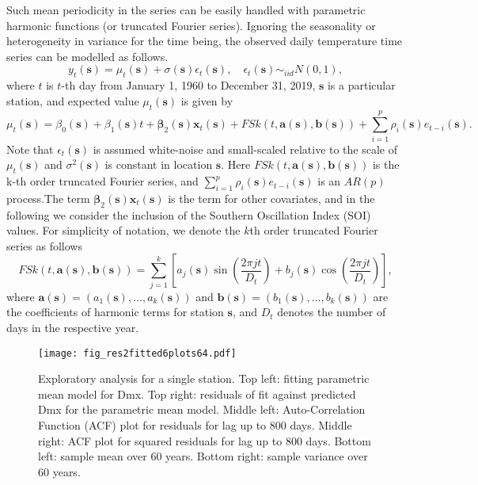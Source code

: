 \documentclass[fleqn,10pt]{wlscirep}
\newcommand{\bx}{\mathbf{x}}
\newcommand{\bs}{\mathbf{s}}
\begin{document}
Such mean periodicity in the series can be easily handled with parametric harmonic functions (or truncated Fourier series). Ignoring the seasonality or heterogeneity in variance for the time being, the observed daily temperature time series can be modelled as follows.
\begin{equation} \label{eq.meanmdl}
	y_{t}(\bs) = \mu_{t}(\bs) + \sigma(\bs)\epsilon_t(\bs), \quad \epsilon_t(\bs) \sim_{iid} N(0,1),
\end{equation}
where $t$ is $t$-th day from January 1, 1960 to December 31, 2019, $\bs$ is a particular station, and expected value $\mu_{t}(\bs)$ is given by
\begin{equation}\mu_{t}(\bs)= \beta_{0}(\bs) + \beta_{1}(\bs) t + \mathbf{\beta}_2(\bs) \bx_t(\bs) + FSk(t,\boldsymbol{a}(\bs),\boldsymbol{b}(\bs)) + \sum_{i=1}^p \rho_i(\bs) e_{t-i}(\bs).
\end{equation}
{Note that $\epsilon_t(\bs)$ is assumed white-noise and small-scaled relative to the scale of $\mu_{t}(\bs)$ and $\sigma^2(\bs)$ is constant in location $\bs$.}
Here $FSk(t,\boldsymbol{a}(\bs),\boldsymbol{b}(\bs))$ is the k-th order truncated Fourier series, and $\sum_{i=1}^p \rho_i(\bs) e_{t-i}(\bs)$ is an $AR(p)$ process.The term $\mathbf{\beta}_2(\bs) \bx_t(\bs)$ is the term for other covariates, and in the following we consider the inclusion of the Southern Oscillation Index (SOI) values. For simplicity of notation, we denote the $k$th order truncated Fourier series as follows
\[ FSk(t,\boldsymbol{a}(\bs),\boldsymbol{b}(\bs)) = \sum_{j=1}^{k}\left[ a_{j}(\bs) \sin\left(\frac{2\pi j t}{D_t}\right) +b_{j}(\bs) \cos\left(\frac{2\pi j t}{D_t}\right) \right],\]
where $\boldsymbol{a}(\bs) = (a_1(\bs),\ldots,a_k(\bs))$ and $\boldsymbol{b}(\bs) = (b_1(\bs),\ldots,b_k(\bs))$ are the coefficients of harmonic terms for station $\bs$, and $D_t$ denotes the number of days in the respective year.

\begin{figure}[H]
	\centering
	\texttt{[image: fig\_res2fitted6plots64.pdf]}
	\caption{Exploratory analysis for a single station. Top left: fitting parametric mean model for Dmx. Top right: residuals of fit against predicted Dmx for the parametric mean model. Middle left: Auto-Correlation Function (ACF) plot for residuals for lag up to 800 days. Middle right: ACF plot for squared residuals for lag up to 800 days. Bottom left: sample mean over 60 years. Bottom right: sample variance over 60 years. }
	\label{fig.examplefit}
\end{figure}
\end{document}
